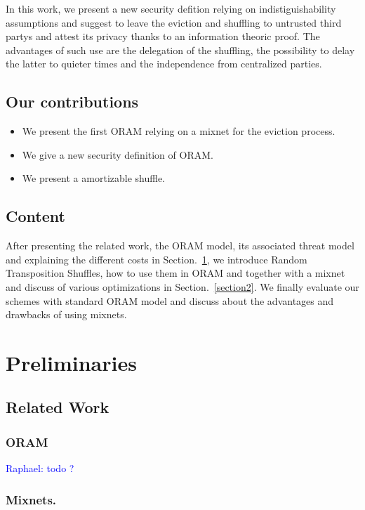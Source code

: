 \documentclass[conference]{IEEEtran}
\newcommand{\raphael}[1]{\textcolor{blue}{Raphael: #1}}
\begin{document}
In this work, we present a new security defition relying on indistiguishability assumptions and suggest to leave the eviction and shuffling to untrusted third partys and attest its privacy thanks to an information theoric proof.
The advantages of such use are the delegation of the shuffling, the possibility to delay the latter to quieter times and the independence from centralized parties.

\subsection{Our contributions}
\begin{itemize}
 \item We present the first ORAM relying on a mixnet for the eviction process.
 \item We give a new security definition of ORAM. %
 \item We present a amortizable shuffle.
\end{itemize}

\subsection{Content}
After presenting the related work, the ORAM model, its associated threat model and explaining the different costs in Section.~\ref{section1}, we introduce Random Transposition Shuffles, how to use them in ORAM and together with a mixnet and discuss of various optimizations in Section.~\ref{section2}.
We finally evaluate our schemes with standard ORAM model and discuss about the advantages and drawbacks of using mixnets.

\section{Preliminaries}
\label{section1}

\subsection{Related Work}
\subsubsection{ORAM}

\raphael{todo ?}

\subsubsection{Mixnets.}
\end{document}
